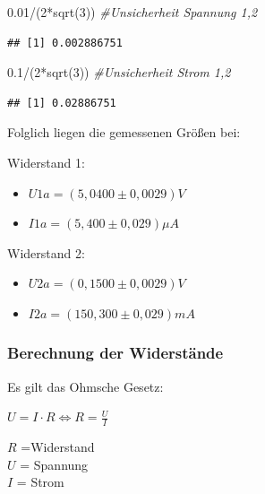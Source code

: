 \documentclass[class=article, crop=false]{standalone}
\newenvironment{Shaded}{\begin{snugshade}}{\end{snugshade}}
\newcommand{\CommentTok}[1]{\textcolor[rgb]{0.56,0.35,0.01}{\textit{#1}}}
\newcommand{\DecValTok}[1]{\textcolor[rgb]{0.00,0.00,0.81}{#1}}
\newcommand{\FloatTok}[1]{\textcolor[rgb]{0.00,0.00,0.81}{#1}}
\newcommand{\FunctionTok}[1]{\textcolor[rgb]{0.00,0.00,0.00}{#1}}
\newcommand{\NormalTok}[1]{#1}
\newcommand{\SpecialCharTok}[1]{\textcolor[rgb]{0.00,0.00,0.00}{#1}}
\begin{document}
\begin{Shaded}
\begin{Highlighting}[]
\FloatTok{0.01}\SpecialCharTok{/}\NormalTok{(}\DecValTok{2}\SpecialCharTok{*}\FunctionTok{sqrt}\NormalTok{(}\DecValTok{3}\NormalTok{)) }\CommentTok{\#Unsicherheit Spannung 1,2}
\end{Highlighting}
\end{Shaded}

\begin{verbatim}
## [1] 0.002886751
\end{verbatim}

\begin{Shaded}
\begin{Highlighting}[]
\FloatTok{0.1}\SpecialCharTok{/}\NormalTok{(}\DecValTok{2}\SpecialCharTok{*}\FunctionTok{sqrt}\NormalTok{(}\DecValTok{3}\NormalTok{)) }\CommentTok{\#Unsicherheit Strom 1,2}
\end{Highlighting}
\end{Shaded}

\begin{verbatim}
## [1] 0.02886751
\end{verbatim}

Folglich liegen die gemessenen Größen bei:

Widerstand 1:

\begin{itemize}
\item $U1a = (5,0400 \pm 0,0029)V$
\item $I1a = (5,400 \pm 0,029) \mu A$
\end{itemize}

Widerstand 2:

\begin{itemize}
\item $U2a = (0,1500 \pm 0,0029)V$
\item $I2a = (150,300 \pm 0,029) mA$
\end{itemize}

\hypertarget{berechnung-der-widerstuxe4nde}{%
\subsubsection{Berechnung der
Widerstände}\label{berechnung-der-widerstuxe4nde}}

Es gilt das Ohmsche Gesetz:

\(U=I\cdot R \Leftrightarrow R = \frac{U}{I}\)

\noindent \(R\) =Widerstand\\
\noindent \(U\) = Spannung\\
\noindent \(I\) = Strom
\end{document}
